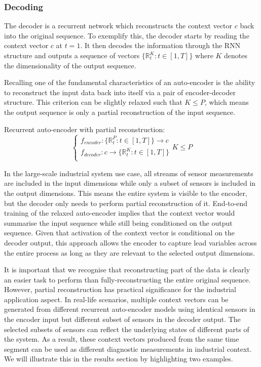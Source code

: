 \documentclass[runningheads]{llncs}
\begin{document}
\subsubsection{Decoding}
The decoder is a recurrent network which reconstructs the context vector \(c\) back into the original sequence. To exemplify this, the decoder starts by reading the context vector \(c\) at \(t=1\). It then decodes the information through the RNN structure and outputs a sequence of vectors \( \{ \mathbb{R}_t^K:t\in [1,T] \} \) where \(K\) denotes the dimensionality of the output sequence. 

Recalling one of the fundamental characteristics of an auto-encoder is the ability to reconstruct the input data back into itself via a pair of encoder-decoder structure. This criterion can be slightly relaxed such that \(K \leqslant P\), which means the output sequence is only a partial reconstruction of the input sequence.

Recurrent auto-encoder with partial reconstruction:
\begin{equation}
\label{seq2seq_autoencoder_relax_encoder}
\begin{cases} 
f_{encoder} : \{ \mathbb{R}_t^P:t \in [1, T] \} \rightarrow c \\
f_{decoder} : c \rightarrow \{ \mathbb{R}_t^K:t \in [1, T] \} \\
\end{cases} K \leqslant P
\end{equation}

In the large-scale industrial system use case, all streams of sensor measurements are included in the input dimensions while only a subset of sensors is included in the output dimensions. This means the entire system is visible to the encoder, but the decoder only needs to perform partial reconstruction of it. End-to-end training of the relaxed auto-encoder implies that the context vector would summarise the input sequence while still being conditioned on the output sequence. Given that activation of the context vector is conditional on the decoder output, this approach allows the encoder to capture lead variables across the entire process as long as they are relevant to the selected output dimensions. 

It is important that we recognise that reconstructing part of the data is clearly an easier task to perform than fully-reconstructing the entire original sequence. However, partial reconstruction has practical significance for the industrial application aspect. In real-life scenarios, multiple context vectors can be generated from different recurrent auto-encoder models using identical sensors in the encoder input but different subset of sensors in the decoder output. The selected subsets of sensors can reflect the underlying states of different parts of the system. As a result, these context vectors produced from the same time segment can be used as different diagnostic measurements in industrial context. We will illustrate this in the results section by highlighting two examples.
\end{document}
